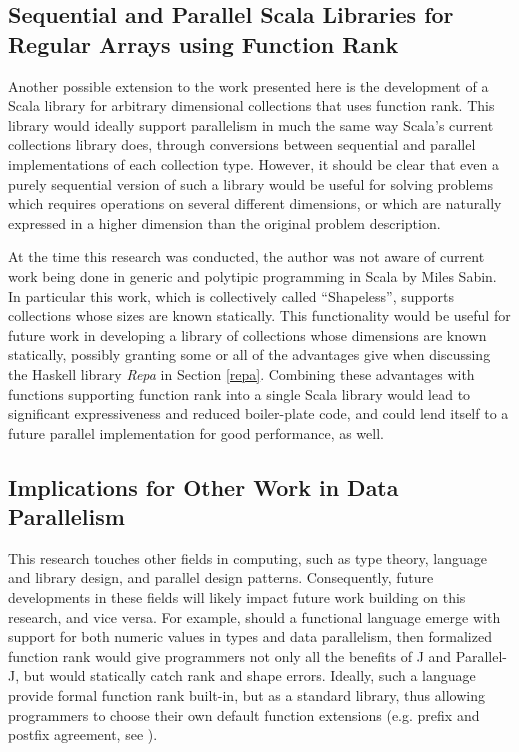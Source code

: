 \subsection{Sequential and Parallel Scala Libraries for Regular Arrays using Function Rank}
Another possible extension to the work presented here 
is the development of a Scala library for arbitrary dimensional collections that uses function rank. 
This library would ideally support parallelism in much the same way 
Scala's current collections library does\cite{pc},
through conversions between sequential and parallel implementations of each collection type. 
However, it should be clear that even 
a purely sequential version of such a library would be useful 
for solving problems which requires operations on several different dimensions, 
or which are naturally expressed in a higher dimension than the original problem description.

At the time this research was conducted, 
the author was not aware of current work being done in 
generic and polytipic programming in Scala by Miles Sabin. 
In particular this work, which is collectively called ``Shapeless''\cite{shapeless}, 
supports collections whose sizes are known statically. 
This functionality would be useful for future work in developing 
a library of collections whose dimensions are known statically, 
possibly granting some or all of the advantages give when discussing 
the Haskell library \textit{Repa} in Section \ref{repa}\cite{dph}.
Combining these advantages with functions supporting function rank into a single Scala library
would lead to significant expressiveness and reduced boiler-plate code, 
and could lend itself to a future parallel implementation for good performance, as well.

\subsection{Implications for Other Work in Data Parallelism}
This research touches other fields in computing, 
such as type theory, language and library design, and parallel design patterns.
Consequently, future developments in these fields will likely impact 
future work building on this research, and vice versa. 
For example, should a functional language emerge 
with support for both numeric values in types and data parallelism, 
then formalized function rank would give programmers not only 
all the benefits of J and Parallel-J, 
but would statically catch rank and shape errors. 
Ideally, such a language provide formal function rank built-in, 
but as a standard library, thus allowing programmers 
to choose their own default function extensions (e.g. prefix and postfix agreement, see \cite{rankanduni}).

